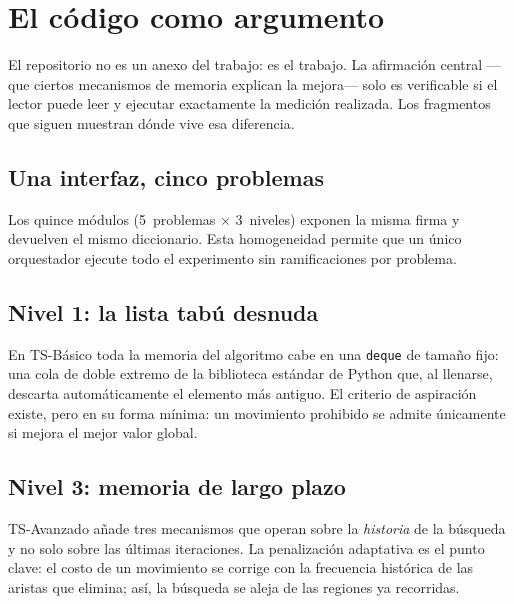 \section{El código como argumento}

El repositorio no es un anexo del trabajo: es el trabajo. La afirmación
central —que ciertos mecanismos de memoria explican la mejora— solo es
verificable si el lector puede leer y ejecutar exactamente la medición realizada.
Los fragmentos que siguen muestran dónde vive esa diferencia.

\subsection{Una interfaz, cinco problemas}

Los quince módulos (5~problemas $\times$ 3~niveles) exponen la misma firma y
devuelven el mismo diccionario. Esta homogeneidad permite que un único
orquestador ejecute todo el experimento sin ramificaciones por problema.



\subsection{Nivel 1: la lista tabú desnuda}

En TS-Básico toda la memoria del algoritmo cabe en una \texttt{deque} de
tamaño fijo: una cola de doble extremo de la biblioteca estándar de Python
que, al llenarse, descarta automáticamente el elemento más antiguo. El criterio de aspiración existe, pero en su forma mínima: un
movimiento prohibido se admite únicamente si mejora el mejor valor global.



\subsection{Nivel 3: memoria de largo plazo}

TS-Avanzado añade tres mecanismos que operan sobre la \emph{historia} de la
búsqueda y no solo sobre las últimas iteraciones. La penalización adaptativa
es el punto clave: el costo de un movimiento se corrige con la frecuencia
histórica de las aristas que elimina; así, la búsqueda se aleja de las
regiones ya recorridas.

